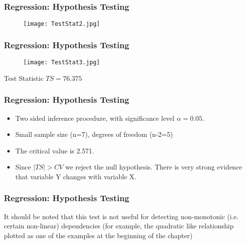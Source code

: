 \documentclass[a4]{beamer}
\begin{document}
\begin{frame}
\frametitle{Regression: Hypothesis Testing}
\begin{figure}
  \texttt{[image: TestStat2.jpg]}\\
\end{figure}
\end{frame}
\begin{frame}
\frametitle{Regression: Hypothesis Testing}
\begin{figure}
  \texttt{[image: TestStat3.jpg]}\\
\end{figure}
Test Statistic $TS = 76.375$
\end{frame}
\begin{frame}
\frametitle{Regression: Hypothesis Testing}
\begin{itemize}
\item Two sided inference procedure, with significance level $\alpha=0.05$.
\item Small sample size (n=7), degrees of freedom (n-2=5)
\item The critical value is 2.571.
\item Since $|TS|>CV$  we reject the null hypothesis. There is very strong evidence
that variable Y changes with variable X.
\end{itemize}
\end{frame}
\begin{frame}
\frametitle{Regression: Hypothesis Testing}
It should be noted that this test is not useful for detecting
non-monotonic (i.e. certain non-linear) dependencies (for example,
the quadratic like relationship plotted as one of the examples at
the beginning of the chapter)
\end{frame}
\end{document}

